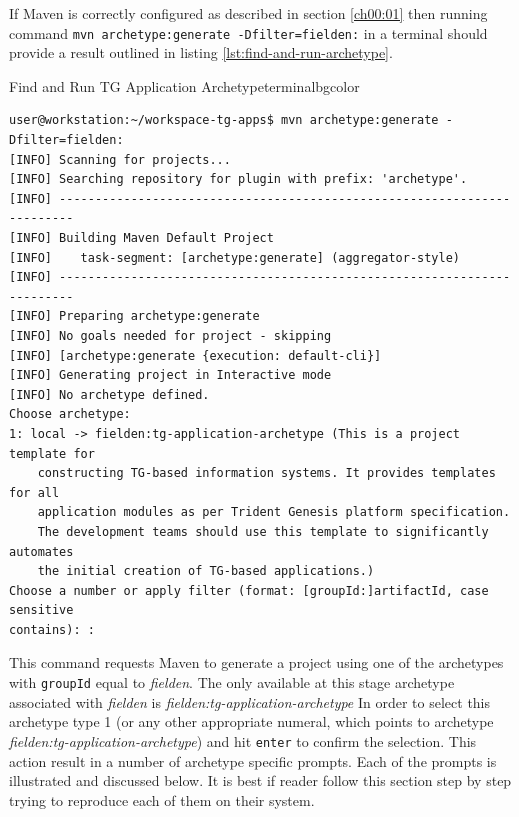   If Maven is correctly configured as described in section \ref{ch00:01} then running command \texttt{mvn archetype:generate -Dfilter=fielden:} in a terminal should provide a result outlined in listing \ref{lst:find-and-run-archetype}.

  \begin{code}{Find and Run TG Application Archetype}{\label{lst:find-and-run-archetype}}{terminalbgcolor}
    \begin{lstlisting}
user@workstation:~/workspace-tg-apps$ mvn archetype:generate -Dfilter=fielden:
[INFO] Scanning for projects...
[INFO] Searching repository for plugin with prefix: 'archetype'.
[INFO] ------------------------------------------------------------------------
[INFO] Building Maven Default Project
[INFO]    task-segment: [archetype:generate] (aggregator-style)
[INFO] ------------------------------------------------------------------------
[INFO] Preparing archetype:generate
[INFO] No goals needed for project - skipping
[INFO] [archetype:generate {execution: default-cli}]
[INFO] Generating project in Interactive mode
[INFO] No archetype defined.
Choose archetype:
1: local -> fielden:tg-application-archetype (This is a project template for 
	constructing TG-based information systems. It provides templates for all 
	application modules as per Trident Genesis platform specification. 
	The development teams should use this template to significantly automates
	the initial creation of TG-based applications.)
Choose a number or apply filter (format: [groupId:]artifactId, case sensitive
contains): : 
    \end{lstlisting}
  \end{code}

  This command requests Maven to generate a project using one of the archetypes with \texttt{groupId} equal to \emph{fielden}.
  The only available at this stage archetype associated with \emph{fielden} is \emph{fielden:tg-application-archetype}
  In order to select this archetype type 1 (or any other appropriate numeral, which points to archetype \emph{fielden:tg-application-archetype}) and hit \texttt{enter} to confirm the selection. 
  This action result in a number of archetype specific prompts. 
  Each of the prompts is illustrated and discussed below.
  It is best if reader follow this section step by step trying to reproduce each of them on their system.

